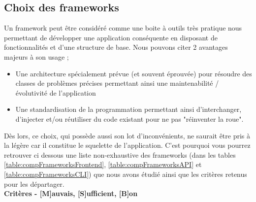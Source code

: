 \subsection*{Choix des frameworks}

Un framework peut être considéré comme une boite à outils très pratique nous permettant de développer une application conséquente en disposant de fonctionnalités et d'une structure de base. Nous pouvons citer 2 avantages majeurs à son usage ; 
\begin{itemize}
    \item Une architecture spécialement prévue (et souvent éprouvée) pour résoudre des classes de problèmes précises permettant ainsi une maintenabilité / évolutivité  de l'application
    \item Une standardisation de la programmation permettant ainsi d'interchanger, d'injecter et/ou réutiliser du code existant pour ne pas "réinventer la roue".
\end{itemize}
Dès lors, ce choix, qui possède aussi son lot d'inconvénients, ne saurait être pris à la légère car il constitue le squelette de l'application. C'est pourquoi vous pourrez retrouver ci dessous une liste non-exhaustive des frameworks (dans les tables \ref{table:compFrameworksFrontend}, \ref{table:compFrameworksAPI} et \ref{table:compFrameworksCLI}) que nous avons étudié ainsi que les critères retenus pour les départager. \\

\noindent\textbf{Critères - [M]auvais, [S]ufficient, [B]on}

